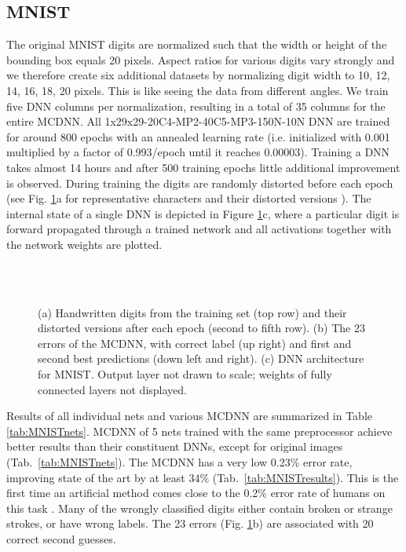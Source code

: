 \documentclass[a4paper]{article}
\begin{document}
\subsection{MNIST}

The original MNIST digits  \cite{lecun:1998} are normalized such that the width or height of the bounding box equals 20 pixels. Aspect ratios for various digits vary strongly and we therefore create six additional datasets by normalizing digit width to 10, 12, 14, 16, 18, 20 pixels. This is like seeing the data from different angles. We train five DNN columns per normalization, resulting in a total of 35 columns for the entire MCDNN. All 1x29x29-20C4-MP2-40C5-MP3-150N-10N DNN are trained for around 800 epochs with an annealed learning rate (i.e. initialized with 0.001 multiplied by a factor of 0.993/epoch until it reaches 0.00003). Training a DNN takes almost 14 hours and after 500 training epochs little additional improvement is observed. During training the digits are randomly distorted before each epoch (see Fig. \ref{fig:MNIST}a for representative characters and their distorted versions \cite{Ciresan:2011a}). The internal state of a single DNN is depicted in Figure \ref{fig:MNIST}c, where a particular digit is forward propagated through a trained network and all activations together with the network weights are plotted.

\begin{figure}[h]
	\centering
	\setlength{\fboxsep}{10pt}
	\setlength{\fboxrule}{0pt}
	\\
	\\
	
\caption{(a) Handwritten digits from the training set (top row) and their distorted versions after each epoch (second to fifth row). (b) The 23 errors of the MCDNN, with correct label (up right) and first and second best predictions (down left and right). (c) DNN architecture for MNIST. Output layer not drawn to scale; weights of fully connected layers not displayed.}
\label{fig:MNIST}
\end{figure}

Results of all individual nets and various MCDNN are summarized in Table \ref{tab:MNISTnets}. MCDNN of 5 nets trained with the same preprocessor achieve better results than their constituent DNNs, except for original images (Tab.~\ref{tab:MNISTnets}). 
The MCDNN has a very low 0.23\% error rate, improving state of the art by at least 34\%  \cite{Ciresan:2010,Ciresan:2011a, RanzatoCVPR:2007} (Tab.~\ref{tab:MNISTresults}). This is the first time an artificial method comes close to the 0.2\% error rate of humans on this task \cite{lecun-95a}. Many of the wrongly classified digits either contain broken or strange strokes, or have wrong labels. The 23 errors (Fig. \ref{fig:MNIST}b) are associated with 20 correct second guesses.
\end{document}
